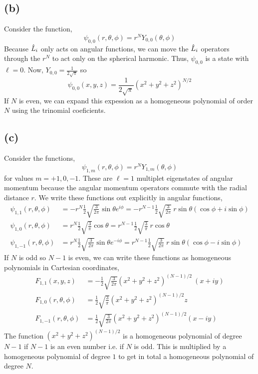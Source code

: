 \documentclass[12pt]{extarticle}
\begin{document}
\subsection*{(b)}

Consider the function, 
\[\psi_{0,0}(r, \theta, \phi) = r^N Y_{0, 0}(\theta, \phi)\]
Because $\hat{L}_i$ only acts on angular functions, we can move the $\hat{L}_i$ operators through the $r^N$ to act only on the spherical harmonic. Thus, $\psi_{0,0}$ is a state with $\ell = 0$. Now, $Y_{0,0} = \frac{1}{2\sqrt{\pi}}$ so 
\[\psi_{0,0}(x, y, z) = \frac{1}{2\sqrt{\pi}} (x^2 + y^2 + z^2)^{N/2}\]
If $N$ is even, we can expand this expession as a homogeneous polynomial of order $N$ using the trinomial coeficients.  

\subsection*{(c)}

Consider the functions,
\[\psi_{1, m}(r, \theta, \phi) = r^{N} Y_{1, m}(\theta, \phi)\]
for values $m = +1, 0, -1$. These are $\ell = 1$ multiplet eigenstates of angular momentum because the angular momentum operators commute with the radial distance $r$. We write these functions out explicitly in angular functions, 
\begin{align*}
\psi_{1, 1}(r, \theta, \phi) & = - r^N \frac{1}{2} \sqrt{\frac{3}{2\pi}} \sin{\theta} e^{i \phi} = - r^{N-1} \frac{1}{2} \sqrt{\frac{3}{2\pi}} \: r \sin{\theta} (\cos{\phi} + i \sin{\phi}) \\
\psi_{1, 0}(r, \theta, \phi) & = r^N \frac{1}{2} \sqrt{\frac{3}{\pi}} \cos{\theta} = r^{N-1} \frac{1}{2} \sqrt{\frac{3}{\pi}} \: r \cos{\theta} \\
\psi_{1, -1}(r, \theta, \phi) & = r^N \frac{1}{2} \sqrt{\frac{3}{2\pi}} \sin{\theta} e^{-i \phi} = r^{N-1} \frac{1}{2} \sqrt{\frac{3}{2\pi}} \: r \sin{\theta} (\cos{\phi} - i \sin{\phi}) 
\end{align*}
If $N$ is odd so $N - 1$ is even, we can write these functions as homogeneous polynomials in Cartesian coordinates,
\begin{align*}
F_{1, 1}(x, y, z) & = - \frac{1}{2} \sqrt{\frac{3}{2\pi}}  (x^2 + y^2 + z^2)^{(N-1)/2} \: (x + i y) \\
F_{1, 0}(r, \theta, \phi) &  = \frac{1}{2} \sqrt{\frac{3}{\pi}} (x^2 + y^2 + z^2)^{(N-1)/2} z \\
F_{1, -1}(r, \theta, \phi) & = \frac{1}{2} \sqrt{\frac{3}{2\pi}} (x^2 + y^2 + z^2)^{(N-1)/2} (x - iy) 
\end{align*} 
The function $(x^2 + y^2 + z^2)^{(N-1)/2}$ is a homogeneous polynomial of degree $N-1$ if $N-1$ is an even number i.e. if $N$ is odd. This is multiplied by a homogeneous polynomial of degree $1$ to get in total a homogeneous polynomial of degree $N$. 
\end{document}

